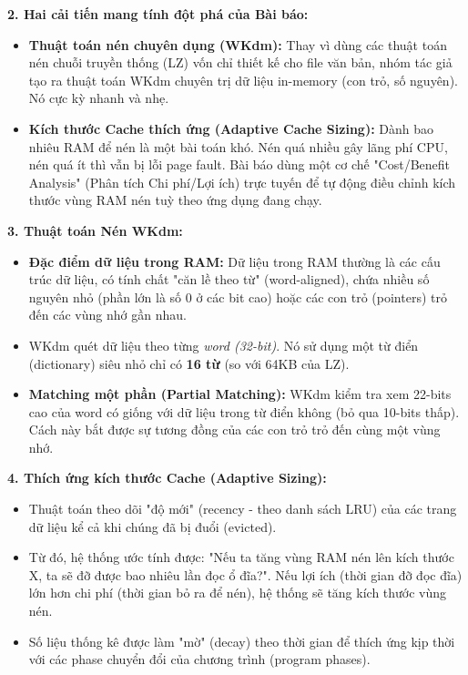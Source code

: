 \documentclass[12pt,a4paper]{article}
\begin{document}
\textbf{2. Hai cải tiến mang tính đột phá của Bài báo:}
\begin{itemize}
    \item \textbf{Thuật toán nén chuyên dụng (WKdm):} 
    Thay vì dùng các thuật toán nén chuỗi truyền thống (LZ) vốn chỉ thiết kế cho file văn bản, nhóm tác giả tạo ra thuật toán WKdm chuyên trị dữ liệu in-memory (con trỏ, số nguyên). Nó cực kỳ nhanh và nhẹ.
    \item \textbf{Kích thước Cache thích ứng (Adaptive Cache Sizing):} 
    Dành bao nhiêu RAM để nén là một bài toán khó. Nén quá nhiều gây lãng phí CPU, nén quá ít thì vẫn bị lỗi page fault. Bài báo dùng một cơ chế "Cost/Benefit Analysis" (Phân tích Chi phí/Lợi ích) trực tuyến để tự động điều chỉnh kích thước vùng RAM nén tuỳ theo ứng dụng đang chạy.
\end{itemize}

\textbf{3. Thuật toán Nén WKdm:}
\begin{itemize}
    \item \textbf{Đặc điểm dữ liệu trong RAM:} Dữ liệu trong RAM thường là các cấu trúc dữ liệu, có tính chất "căn lề theo từ" (word-aligned), chứa nhiều số nguyên nhỏ (phần lớn là số 0 ở các bit cao) hoặc các con trỏ (pointers) trỏ đến các vùng nhớ gần nhau.
    \item WKdm quét dữ liệu theo từng \textit{word (32-bit)}. Nó sử dụng một từ điển (dictionary) siêu nhỏ chỉ có \textbf{16 từ} (so với 64KB của LZ).
    \item \textbf{Matching một phần (Partial Matching):} WKdm kiểm tra xem 22-bits cao của word có giống với dữ liệu trong từ điển không (bỏ qua 10-bits thấp). Cách này bắt được sự tương đồng của các con trỏ trỏ đến cùng một vùng nhớ.
\end{itemize}

\textbf{4. Thích ứng kích thước Cache (Adaptive Sizing):}
\begin{itemize}
    \item Thuật toán theo dõi "độ mới" (recency - theo danh sách LRU) của các trang dữ liệu kể cả khi chúng đã bị đuổi (evicted).
    \item Từ đó, hệ thống ước tính được: "Nếu ta tăng vùng RAM nén lên kích thước X, ta sẽ đỡ được bao nhiêu lần đọc ổ đĩa?". Nếu lợi ích (thời gian đỡ đọc đĩa) lớn hơn chi phí (thời gian bỏ ra để nén), hệ thống sẽ tăng kích thước vùng nén.
    \item Số liệu thống kê được làm "mờ" (decay) theo thời gian để thích ứng kịp thời với các phase chuyển đổi của chương trình (program phases).
\end{itemize}
\end{document}
